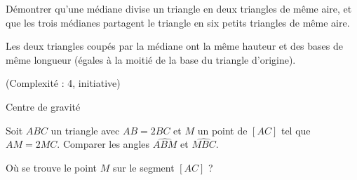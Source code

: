 \begin{exo}
Démontrer qu'une médiane divise un triangle en deux triangles de même aire, et que les trois médianes partagent le triangle en six petits triangles de même aire.
\begin{sol}
Les deux triangles coupés par la médiane ont la même hauteur et des bases de même longueur (égales à la moitié de la base du triangle d'origine).
\end{sol}
\end{exo}



\begin{exo}[Triangle avec $AB=2BC$ $\heartsuit$\faLightbulbO]
(Complexité : 4, initiative)
\begin{prerequis}
Centre de gravité
\end{prerequis}
Soit $ABC$ un triangle avec $AB = 2 BC$ et $M$ un point de $[AC]$ tel que $AM = 2 MC$. Comparer les angles $\widehat{ABM}$ et $\widehat{MBC}$.
\begin{hint}
Où se trouve le point $M$ sur le segment $[AC]$ ?
\end{hint}
\begin{sol}


\end{sol}
\end{exo}
